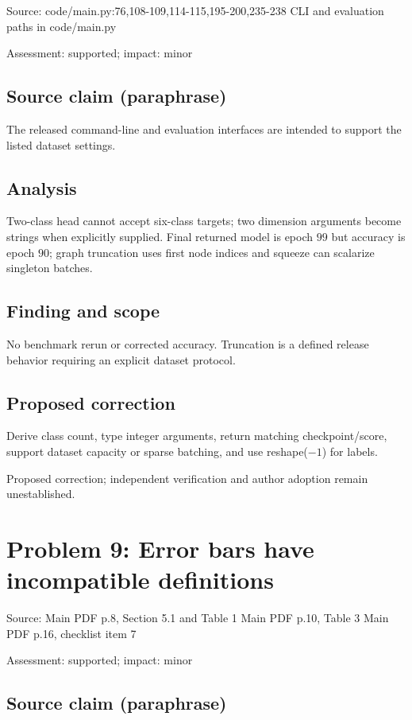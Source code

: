 \documentclass[11pt]{article}
\begin{document}
Source: code/main.py:76,108-109,114-115,195-200,235-238 CLI and evaluation paths in code/main.py

Assessment: supported; impact: minor

\subsection*{Source claim (paraphrase)}

The released command-line and evaluation interfaces are intended to support the listed dataset settings.

\subsection*{Analysis}

Two-class head cannot accept six-class targets; two dimension arguments become strings when explicitly supplied. Final returned model is epoch \(99\) but accuracy is epoch \(90\); graph truncation uses first node indices and squeeze can scalarize singleton batches.

\subsection*{Finding and scope}

No benchmark rerun or corrected accuracy. Truncation is a defined release behavior requiring an explicit dataset protocol.

\subsection*{Proposed correction}

Derive class count, type integer arguments, return matching checkpoint/score, support dataset capacity or sparse batching, and use reshape(\(-1\)) for labels.

Proposed correction; independent verification and author adoption remain unestablished.

\section*{Problem 9: Error bars have incompatible definitions}

Source: Main PDF p.8, Section 5.1 and Table 1 Main PDF p.10, Table 3 Main PDF p.16, checklist item 7

Assessment: supported; impact: minor

\subsection*{Source claim (paraphrase)}
\end{document}
